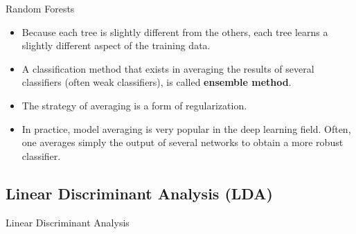 \documentclass[xcolor=pdftex,dvipsnames,table]{beamer}
\begin{document}
\begin{frame}{Random Forests}
\begin{itemize}
	\item Because each tree is slightly different from the others, each tree learns a slightly different aspect of the training data.
	\item A classification method that exists in averaging the results of several classifiers (often weak classifiers), is called {\bf ensemble method}.
	\item The strategy of averaging is a form of regularization.
	\item In practice, model averaging is very popular in the deep learning field. Often, one averages simply the output of several networks to obtain a more robust classifier.
\end{itemize}
\end{frame}

\subsection{Linear Discriminant Analysis (LDA)}
\begin{frame}[plain,c]
\begin{center}
\Huge Linear Discriminant Analysis
\end{center}
\end{frame}


\end{document}
